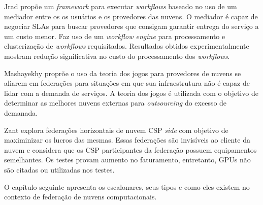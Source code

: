 Jrad\cite{Jrad:2013:BFM:2462326.2462339} propõe um \textit{framework} para executar \textit{workflows} baseado no uso de um mediador entre os os usuários e os provedores das nuvens. O mediador é capaz de negociar \acrshort{SLA}s para buscar provedores que consigam garantir entrega do serviço a um custo menor. Faz uso de um \textit{workflow engine} para processamento e clusterização de \textit{workflows} requisitados. Resultados obtidos experimentalmente mostram redução significativa no custo do processamento dos \textit{workflows}.

Mashayekhy\cite{6853386} proprõe o uso da teoria dos jogos para provedores de nuvens se aliarem em federações para situações em que sua infraestrutura não é capaz de lidar com a demanda de serviços. A teoria dos jogos é utilizada com o objetivo de determinar as melhores nuvens externas para \textit{outsourcing} do excesso de demanada.

Zant\cite{6814036} explora federações horizontais de nuvem \acrfull{CSP} \textit{side} com objetivo de maximinizar os lucros das mesmas. Essas federações são invisíveis ao cliente da nuvem e considera que os \acrshort{CSP} participantes da federação possuem equipamentos semelhantes. Os testes provam aumento no faturamento, entretanto, \acrshort{GPU}s não são citadas ou utilizadas nos testes.


O capítulo seguinte apresenta os escalonares, seus tipos e como eles existem no contexto de federação de nuvens computacionais.

